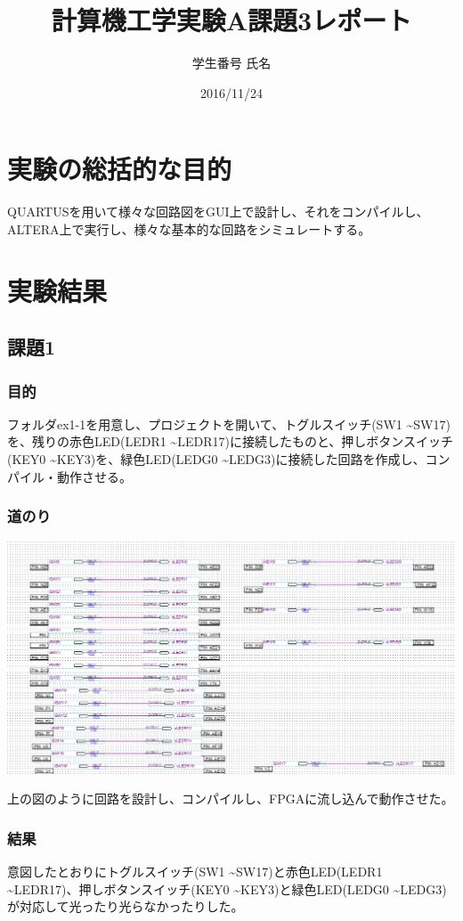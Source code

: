 \documentclass[a4paper]{jarticle}
\title{計算機工学実験A課題3レポート}
\author{学生番号 氏名}
\date{2016/11/24}
\begin{document}
\maketitle
\section{実験の総括的な目的}
QUARTUSを用いて様々な回路図をGUI上で設計し、それをコンパイルし、ALTERA上で実行し、様々な基本的な回路をシミュレートする。
\section{実験結果}
\subsection{課題1}
\subsubsection{目的}
フォルダex1-1を用意し、プロジェクトを開いて、トグルスイッチ(SW1 \textasciitilde SW17)を、残りの赤色LED(LEDR1 \textasciitilde LEDR17)に接続したものと、押しボタンスイッチ(KEY0 \textasciitilde KEY3)を、緑色LED(LEDG0 \textasciitilde LEDG3)に接続した回路を作成し、コンパイル・動作させる。
\subsubsection{道のり}
\begin{center}
	\includegraphics[width=15cm]{work1.PNG}
\end{center}
上の図のように回路を設計し、コンパイルし、FPGAに流し込んで動作させた。
\subsubsection{結果}
意図したとおりにトグルスイッチ(SW1 \textasciitilde SW17)と赤色LED(LEDR1 \textasciitilde LEDR17)、押しボタンスイッチ(KEY0 \textasciitilde KEY3)と緑色LED(LEDG0 \textasciitilde LEDG3)が対応して光ったり光らなかったりした。
\end{document}
